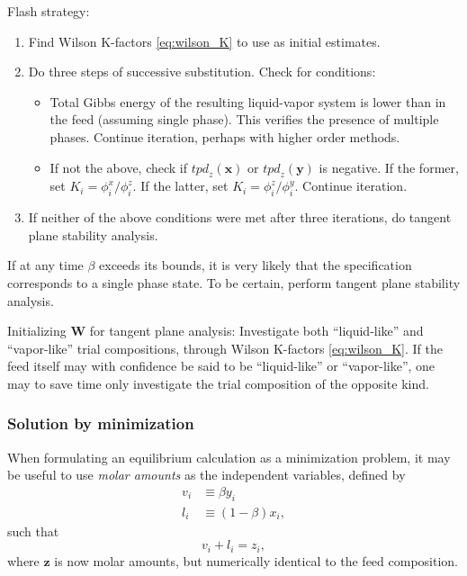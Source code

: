 \documentclass[english]{../thermomemo/thermomemo}
\newcommand*{\vektor}[1]{\boldsymbol{#1}}%
\begin{document}
Flash strategy:
\begin{enumerate}
  \item Find Wilson K-factors \eqref{eq:wilson_K} to use as initial estimates.
  \item Do three steps of successive substitution. Check for conditions:
    \begin{itemize}
      \item Total Gibbs energy of the resulting liquid-vapor system is lower than in the feed (assuming single phase). This verifies the presence of 
              multiple phases. Continue iteration, perhaps with higher order methods.
      \item If not the above, check  if $\mathit{tpd}_z(\vektor{x})$ or $\mathit{tpd}_z(\vektor{y})$ is negative. If the former, set 
        $K_i = \phi_i^x / \phi_i^z$. If the latter, set $K_i = \phi_i^z / \phi_i^y$. Continue iteration.
    \end{itemize}
  \item If neither of the above conditions were met after three iterations, do tangent plane stability analysis.
\end{enumerate}
If at any time $\beta$ exceeds its bounds, it is very likely that the specification corresponds to a single phase state. 
To be certain, perform tangent plane stability analysis.


Initializing $\vektor{W}$ for tangent plane analysis: 
Investigate both ``liquid-like'' and ``vapor-like'' trial compositions, through 
Wilson K-factors \eqref{eq:wilson_K}. If the feed itself may with confidence be said to be ``liquid-like'' or ``vapor-like'', 
one may to save time only investigate the trial composition of the opposite kind.



\subsubsection{Solution by minimization}
When formulating an equilibrium calculation as a minimization problem, it 
may be useful to use \textit{molar amounts} as the independent variables, 
defined by 
\begin{align}
  v_i &\equiv \beta y_i\nonumber\\
  l_i &\equiv (1-\beta) x_i,
  \label{}
\end{align}
such that
\begin{equation}
  v_i + l_i = z_i,
  \label{}
\end{equation}
where $\vektor{z}$ is now molar amounts, but numerically identical to the feed composition.
\end{document}
